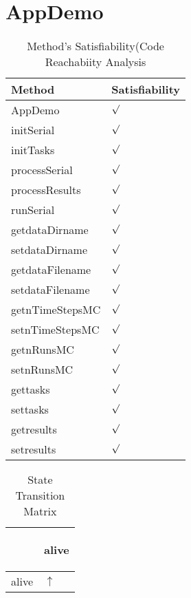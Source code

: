\documentclass[10pt]{article}
\begin{document}
\section{{\color{Fuchsia}AppDemo}}
\label{AppDemo}
\begin{longtable}{|l|l|}
\caption{Method's Satisfiability(Code Reachabiity Analysis}\\
\hline
Method & Satisfiability\\
\hline
AppDemo&{\color{blue}$\surd$}\\
\hline
initSerial&{\color{blue}$\surd$}\\
\hline
initTasks&{\color{blue}$\surd$}\\
\hline
processSerial&{\color{blue}$\surd$}\\
\hline
processResults&{\color{blue}$\surd$}\\
\hline
runSerial&{\color{blue}$\surd$}\\
\hline
getdataDirname&{\color{blue}$\surd$}\\
\hline
setdataDirname&{\color{blue}$\surd$}\\
\hline
getdataFilename&{\color{blue}$\surd$}\\
\hline
setdataFilename&{\color{blue}$\surd$}\\
\hline
getnTimeStepsMC&{\color{blue}$\surd$}\\
\hline
setnTimeStepsMC&{\color{blue}$\surd$}\\
\hline
getnRunsMC&{\color{blue}$\surd$}\\
\hline
setnRunsMC&{\color{blue}$\surd$}\\
\hline
gettasks&{\color{blue}$\surd$}\\
\hline
settasks&{\color{blue}$\surd$}\\
\hline
getresults&{\color{blue}$\surd$}\\
\hline
setresults&{\color{blue}$\surd$}\\
\hline
\end{longtable}
\begin{longtable}{|l|l|}
\caption{State Transition Matrix}\\
\hline
&\begin{sideways}alive\end{sideways}\\
\hline
alive&{\color{blue}$\uparrow$}\\
\hline
\end{longtable}
\end{document}
